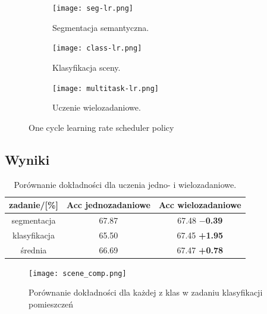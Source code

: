 \begin{figure}
    \centering
    \begin{subfigure}[b]{0.32\textwidth}
        \centering
        \texttt{[image: seg-lr.png]}
        \caption{Segmentacja semantyczna.}
    \end{subfigure}
    \hfill
    \begin{subfigure}[b]{0.32\textwidth}
        \centering
        \texttt{[image: class-lr.png]}
        \caption{Klasyfikacja sceny.}
    \end{subfigure}
    \hfill
    \begin{subfigure}[b]{0.32\textwidth}
        \centering
        \texttt{[image: multitask-lr.png]}
        \caption{Uczenie wielozadaniowe.}
    \end{subfigure}
    \caption[]{One cycle learning rate scheduler policy}
    \label{fig:one-cycle-policy}
\end{figure}
\subsection{Wyniki}

\begin{table}[]
    \centering
    \begin{tabular}{c|cc}
        zadanie/{[}\%{]} & Acc jednozadaniowe & Acc wielozadaniowe \\ \hline
        segmentacja      & 67.87               & 67.48  \footnotesize{\textbf{$-$0.39}}        \\
        klasyfikacja     & 65.50               & 67.45  \footnotesize{\textbf{+1.95}}        \\ \hline
    średnia          & 66.69               & 67.47  \footnotesize{\textbf{+0.78}}       
\end{tabular}
\caption{Porównanie dokładności dla uczenia jedno- i wielozadaniowe.}
\label{tab:acc-por}
\end{table}

\begin{figure}
    \centering
    \texttt{[image: scene\_comp.png]}
    \caption{Porównanie dokładności dla każdej z klas w zadaniu klasyfikacji pomieszczeń}
    \label{fig:scene_comp}
\end{figure}

